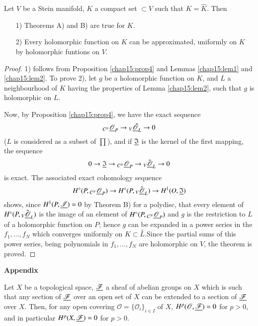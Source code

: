 \begin{theorem*}
Let $V$ be a Stein manifold, $K$ a compact set $\subset V$ such that
$K = \hat{K}$. Then 
\begin{itemize}
\item[1)] Theorems A) and B) are true for $K$.

\item[2)] Every holomorphic function on $K$ can be approximated,
  uniformly on $K$ by holomorphic funtions on $V$.
\end{itemize}
\end{theorem*}

\begin{proof}
1) follows from Proposition \ref{chap15:prop4} and Lemmas
\ref{chap15:lem1} and \ref{chap15:lem2}. To 
prove 2), let $g$ 
be a holomorphic function on $K$, and $L$ a neighbourhood of $K$
having the properties of Lemma \ref{chap15:lem2}, such that $g$ is
holomorphic on $L$.  

Now, by Proposition \ref{chap15:prop4}, we have the exact sequence
$$
{}_{C^N} \underline{\mathscr{O}}_P \to {}_V\tilde{\underline{\mathscr{O}}_L} \to 0
$$
($L$ is considered as a subset of $\prod$),
and if $\underline{\mathfrak{I}}$ is the kernel of the first mapping, the
sequence
$$
0 \to \underline{\mathfrak{I}}  \to {}_{C^N}\underline{\mathscr{O}}_P \to{}_V
\tilde{\underline{\mathscr{O}}}_L \to 0
$$
is exact. The associated exact cohomology sequence
$$
H^\circ (P, {}_{C^N} \underline{\mathscr{O}}_P) \to H^\circ (P, {}_V 
\tilde{\underline{\mathscr{O}}}_L ) \to H^1 (O, \underline{\mathfrak{I}})  
$$
shows, since $H^1 (P,\underline{\mathscr{I}}) = 0$ by Theorem B) for a
polydisc, that every element of $H^\circ (P, {}_V
\tilde{\underline{\mathscr{O}}}_L)$ is the image of an element of $H^\circ
(P,{}_{C^N} \underline{\mathscr{O}}_P)$ and $g$ is the restriction to $L$ of a
holomorphic function on $P$; hence $g$ can be expanded in a power
series in the $f_1, \ldots, f_N$ which converges uniformly on $K
\subset \overset{\circ}{L}$.\pageoriginale Since the partial sums of
this power series, being polynomials in $f_1, \ldots, f_N$ are
holomorphic on $V$, the theorem is proved.
\end{proof}

\begin{center}
\textbf{Appendix}
\end{center}

\begin{theorem*}
Let $X$ be a topological space, $\underline{\mathscr{F}}$ a sheaf of abelian
groups on $X$ which is such that any section of $\underline{\mathscr{F}}$ over
an open set of $X$ can be extended to a section of $\underline{\mathscr{F}}$
over $X$. Then, for any open covering $\mathscr{O} =
\{\mathscr{O}_i\}_{i \in I}$ of $X$, $H^p (\mathscr{O},
\underline{\mathscr{F}}) = 0$ for $p > 0$, and in particular $H^p (X,
\underline{\mathscr{F}}) = 0$ for $p > 0$. 
\end{theorem*}

